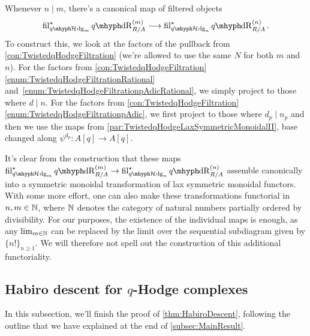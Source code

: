 \documentclass[DIV=12,numbers=enddot,leqno,bibliography=totoc]{scrartcl}
\begin{document}
	\begin{numpar}\label{con:TwistedqHodgeFiltrationFunctorial}
		Whenever $n\mid m$, there's a canonical map of filtered objects
		\begin{equation*}
			\fil_{\qHhodge_m}^\star \qdeRham_{R/A}^{(m)}\longrightarrow  \fil_{\qHhodge_n}^\star \qdeRham_{R/A}^{(n)}\,.
		\end{equation*}
		To construct this, we look at the factors of the pullback from \cref{con:TwistedqHodgeFiltration} (we're allowed to use the same $N$ for both $m$ and $n$). For the factors from \cref{con:TwistedqHodgeFiltration}\cref{enum:TwistedqHodgeFiltrationRational} and~\cref{enum:TwistedqHodgeFiltrationpAdicRational}, we simply project to those where $d\mid n$. For the factors from \cref{con:TwistedqHodgeFiltration}\cref{enum:TwistedqHodgeFiltrationpAdic}, we first project to those where $d_p\mid n_p$ and then we use the maps from \cref{par:TwistedqHodgeLaxSymmetricMonoidalII}, base changed along $\psi^{d_p}\colon A[q]\rightarrow A[q]$.
		
		It's clear from the construction that these maps $ \fil_{\qHhodge_m}^\star \qdeRham_{R/A}^{(m)}\rightarrow  \fil_{\qHhodge_n}^\star \qdeRham_{R/A}^{(n)}$ assemble canonically into a symmetric monoidal transformation of lax symmetric monoidal functors. With some more effort, one can also make these transformations functorial in~$n,m\in\mathbb{N}$, where $\mathbb{N}$ denotes the category of natural numbers partially ordered by divisibility. For our purposes, the existence of the individual maps is enough, as any $\operatorname*{lim}_{m\in\mathbb{N}}$ can be replaced by the limit over the sequential subdiagram given by $\{n!\}_{n\geqslant 1}$. We will therefore not spell out the construction of this additional functoriality.
	\end{numpar}
	
	\subsection{Habiro descent for \texorpdfstring{$q$}{q}-Hodge complexes}\label{subsec:qHodgeHabiroDescent}
	In this subsection, we'll finish the proof of \cref{thm:HabiroDescent}, following the outline that we have explained at the end of \cref{subsec:MainResult}. 
	
\end{document}
